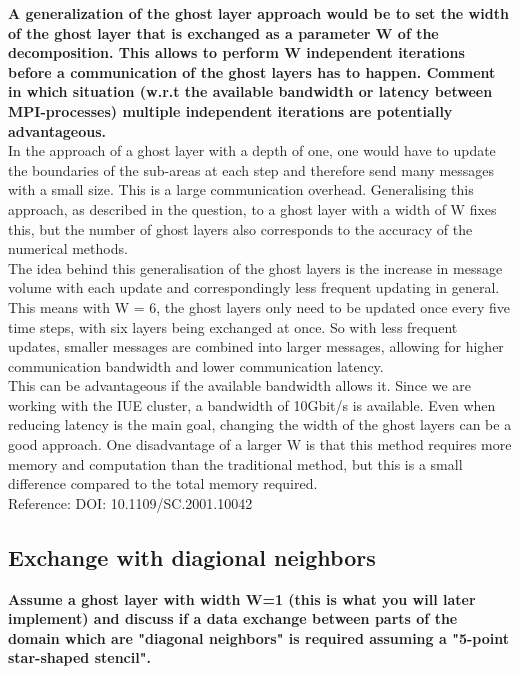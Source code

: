 \documentclass[10pt,a4paper]{article}
\begin{document}
\textbf{A generalization of the ghost layer approach would be to set the width of the ghost 
layer that is exchanged as a parameter W of the decomposition. This allows to perform W independent 
iterations before a communication of the ghost layers has to happen. Comment in which situation 
(w.r.t the available bandwidth or latency between MPI-processes) multiple independent iterations are 
potentially advantageous.} \\


In the approach of a ghost layer with a depth of one, one would have to update the boundaries of the sub-areas at 
each step and therefore send many messages with a small size. This is a large communication overhead. Generalising 
this approach, as described in the question, to a ghost layer with a width of W fixes this, but the number of ghost 
layers also corresponds to the accuracy of the numerical methods.\\

The idea behind this generalisation of the ghost layers is the increase in message volume with each update and 
correspondingly less frequent updating in general. This means with W = 6, the ghost layers only need to be updated 
once every five time steps, with six layers being exchanged at once. So with less frequent updates, smaller messages 
are combined into larger messages, allowing for higher communication bandwidth and lower communication latency. \\ 

This can be advantageous if the available bandwidth allows it. Since we are working with the IUE cluster, a bandwidth 
of 10Gbit/s is available. Even when reducing latency is the main goal, changing the width of the ghost layers can be 
a good approach. One disadvantage of a larger W is that this method requires more memory and computation than the 
traditional method, but this is a small difference compared to the total memory required. \\ 
 
Reference: DOI: 10.1109/SC.2001.10042 \\

\newpage
\subsection{Exchange with diagional neighbors}

\textbf{Assume a ghost layer with width W=1 (this is what you will later implement) 
and discuss if a data exchange between parts of the domain which are "diagonal neighbors" is 
required assuming a "5-point star-shaped stencil".} \\
\end{document}
